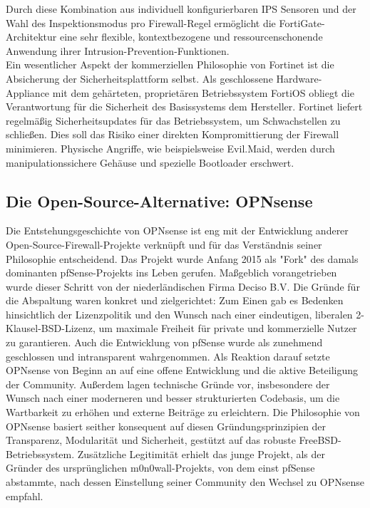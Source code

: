 Durch diese Kombination aus individuell konfigurierbaren IPS Sensoren und der Wahl des Inspektionsmodus pro Firewall-Regel ermöglicht die FortiGate-Architektur eine sehr flexible, kontextbezogene und ressourcenschonende Anwendung ihrer Intrusion-Prevention-Funktionen.\\

Ein wesentlicher Aspekt der kommerziellen Philosophie von Fortinet ist die Absicherung der Sicherheitsplattform selbst. Als geschlossene Hardware-Appliance mit dem gehärteten, proprietären Betriebssystem FortiOS obliegt die Verantwortung für die Sicherheit des Basissystems dem Hersteller. Fortinet liefert regelmäßig Sicherheitsupdates für das Betriebssystem, um Schwachstellen zu schließen. Dies soll das Risiko einer direkten Kompromittierung der Firewall minimieren. Physische Angriffe, wie beispielsweise Evil.Maid, werden durch manipulationssichere Gehäuse und spezielle Bootloader erschwert.

\subsection{Die Open-Source-Alternative: OPNsense}
Die Entstehungsgeschichte von OPNsense ist eng mit der Entwicklung anderer Open-Source-Firewall-Projekte verknüpft und für das Verständnis seiner Philosophie entscheidend. Das Projekt wurde Anfang 2015 als "Fork" des damals dominanten pfSense-Projekts ins Leben gerufen. Maßgeblich vorangetrieben wurde dieser Schritt von der niederländischen Firma Deciso B.V. Die Gründe für die Abspaltung waren konkret und zielgerichtet: Zum Einen gab es Bedenken hinsichtlich der Lizenzpolitik und den Wunsch nach einer eindeutigen, liberalen 2-Klausel-BSD-Lizenz, um maximale Freiheit für private und kommerzielle Nutzer zu garantieren. Auch die Entwicklung von pfSense wurde als zunehmend geschlossen und intransparent wahrgenommen. Als Reaktion darauf setzte OPNsense von Beginn an auf eine offene Entwicklung und die aktive Beteiligung der Community. Außerdem lagen technische Gründe vor, insbesondere der Wunsch nach einer moderneren und besser strukturierten Codebasis, um die Wartbarkeit zu erhöhen und externe Beiträge zu erleichtern. Die Philosophie von OPNsense basiert seither konsequent auf diesen Gründungsprinzipien der Transparenz, Modularität und Sicherheit, gestützt auf das robuste FreeBSD-Betriebssystem. Zusätzliche Legitimität erhielt das junge Projekt, als der Gründer des ursprünglichen m0n0wall-Projekts, von dem einst pfSense abstammte, nach dessen Einstellung seiner Community den Wechsel zu OPNsense empfahl.\cite{Fork}\\\\

